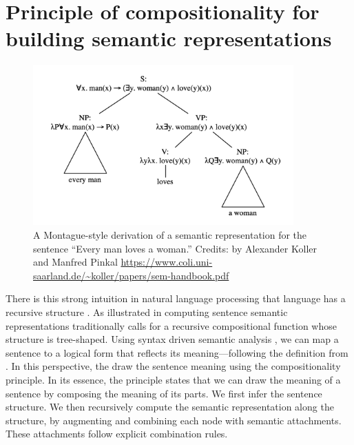 \section{Principle of compositionality for building semantic representations}

\begin{figure}[h!]
	\includegraphics[width=10cm]{images/lambda_form.png}
	\caption[Lambda form]{A Montague-style \parencite{montague_1973} derivation of a semantic representation for the sentence “Every man loves a woman.” Credits: by Alexander Koller and Manfred Pinkal \url{https://www.coli.uni-saarland.de/~koller/papers/sem-handbook.pdf}}
\end{figure}

There is this strong intuition in natural language processing that language has a recursive structure \parencite{chomsky_56, shen_19}. As illustrated in  computing sentence semantic representations traditionally calls for a recursive compositional function whose structure is tree-shaped. Using syntax driven semantic analysis \parencite{jurafsky_2009}, we can map a sentence to a logical form that reflects its meaning—following the definition from . In this perspective, the draw the sentence meaning using the compositionality principle. In its essence, the principle states that we can draw the meaning of a sentence by composing the meaning of its parts. We first infer the sentence structure. We then recursively compute the semantic representation along the structure, by augmenting and combining each node with semantic attachments. These attachments follow explicit combination rules.

